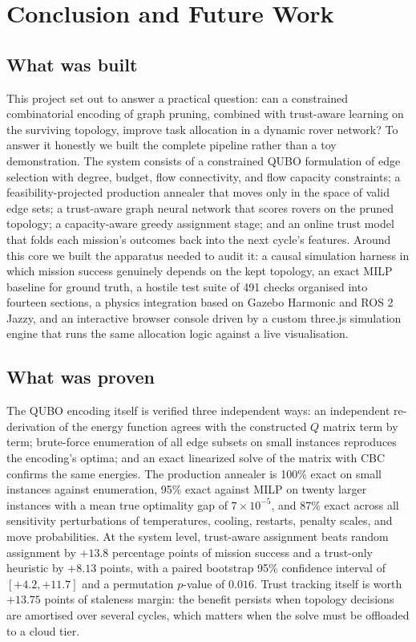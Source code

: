 \section{Conclusion and Future Work}

\subsection{What was built}

This project set out to answer a practical question: can a constrained
combinatorial encoding of graph pruning, combined with trust-aware learning
on the surviving topology, improve task allocation in a dynamic rover
network? To answer it honestly we built the complete pipeline rather than a
toy demonstration. The system consists of a constrained QUBO formulation of
edge selection with degree, budget, flow connectivity, and flow capacity
constraints; a feasibility-projected production annealer that moves only in
the space of valid edge sets; a trust-aware graph neural network that scores
rovers on the pruned topology; a capacity-aware greedy assignment stage; and
an online trust model that folds each mission's outcomes back into the next
cycle's features. Around this core we built the apparatus needed to audit
it: a causal simulation harness in which mission success genuinely depends
on the kept topology, an exact MILP baseline for ground truth, a hostile
test suite of 491 checks organised into fourteen sections, a physics
integration based on Gazebo Harmonic and ROS 2 Jazzy, and an interactive
browser console driven by a custom three.js simulation engine that runs the
same allocation logic against a live visualisation.

\subsection{What was proven}

The QUBO encoding itself is verified three independent ways: an independent
re-derivation of the energy function agrees with the constructed $Q$ matrix
term by term; brute-force enumeration of all edge subsets on small instances
reproduces the encoding's optima; and an exact linearized solve of the
matrix with CBC confirms the same energies. The production annealer is 100\%
exact on small instances against enumeration, 95\% exact against MILP on
twenty larger instances with a mean true optimality gap of $7\times10^{-5}$,
and 87\% exact across all sensitivity perturbations of temperatures,
cooling, restarts, penalty scales, and move probabilities. At the system
level, trust-aware assignment beats random assignment by $+13.8$ percentage
points of mission success and a trust-only heuristic by $+8.13$ points, with
a paired bootstrap 95\% confidence interval of $[+4.2, +11.7]$ and a
permutation $p$-value of $0.016$. Trust tracking itself is worth $+13.75$
points of staleness margin: the benefit persists when topology decisions are
amortised over several cycles, which matters when the solve must be
offloaded to a cloud tier.

